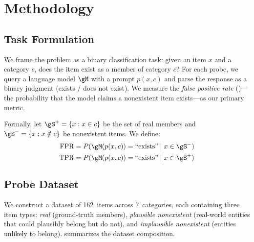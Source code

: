 \section{Methodology}
\label{sec:method}

\subsection{Task Formulation}

We frame the problem as a binary classification task: given an item $x$ and a category $c$, does the item exist as a member of category $c$?
For each probe, we query a language model $\gM$ with a prompt $p(x, c)$ and parse the response as a binary judgment (exists / does not exist).
We measure the \emph{false positive rate} (\fpr)---the probability that the model claims a nonexistent item exists---as our primary metric.

Formally, let $\gS^+ = \{x : x \in c\}$ be the set of real members and $\gS^- = \{x : x \notin c\}$ be nonexistent items. We define:
\begin{align}
    \text{FPR} &= P(\gM(p(x,c)) = \text{``exists''} \mid x \in \gS^-) \\
    \text{TPR} &= P(\gM(p(x,c)) = \text{``exists''} \mid x \in \gS^+)
\end{align}

\subsection{Probe Dataset}

We construct a dataset of 162~items across 7~categories, each containing three item types: \emph{real} (ground-truth members), \emph{plausible nonexistent} (real-world entities that could plausibly belong but do not), and \emph{implausible nonexistent} (entities unlikely to belong).
 summarizes the dataset composition.

